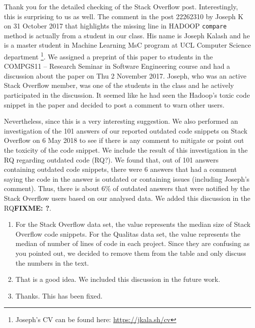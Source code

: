 \documentclass[a4paper,twoside,10pt]{reviewresponse}
\newcommand\FIXME[1]{{\color{red}\textbf{FIXME: #1}}}
\begin{document}
Thank you for the detailed checking of the Stack Overflow post. Interestingly, this is surprising to us as well. The comment in the post 22262310 by Joseph K on 31 October 2017 that highlights the missing line in HADOOP \texttt{compare} method is actually from a student in our class. His name is Joseph Kalash and he is a master student in Machine Learning MsC program at UCL Computer Science department \footnote{Joseph's CV can be found here: \url{https://jkala.sh/cv}}. We assigned a preprint of this paper to students in the COMPGS11 -- Research Seminar in Software Engineering course and had a discussion about the paper on Thu 2 November 2017. Joseph, who was an active Stack Overflow member, was one of the students in the class and he actively participated in the discussion. It seemed like he had seen the Hadoop's toxic code snippet in the paper and decided to post a comment to warn other users.

Nevertheless, since this is a very interesting suggestion. We also performed an investigation of the 101 answers of our reported outdated code snippets on Stack Overflow on 6 May 2018 to see if there is any comment to mitigate or point out the toxicity of the code snippet. We include the result of this investigation in the RQ regarding outdated code (RQ?). We found that, out of 101 answers containing outdated code snippets, there were 6 answers that had a comment saying the code in the answer is outdated or containing issues (including Joseph's comment). Thus, there is about 6\% of outdated answers that were notified by the Stack Overflow users based on our analysed data. We added this discussion in the RQ\FIXME{?}.


\begin{enumerate}
	\item For the Stack Overflow data set, the value represents the median size of Stack Overflow code snippets. For the Qualitas data set, the value represents the median of number of lines of code in each project. Since they are confusing as you pointed out, we decided to remove them from the table and only discuss the numbers in the text.
	\item That is a good idea. We included this discussion in the future work.
	\item Thanks. This has been fixed.
\end{enumerate}
\end{document}
